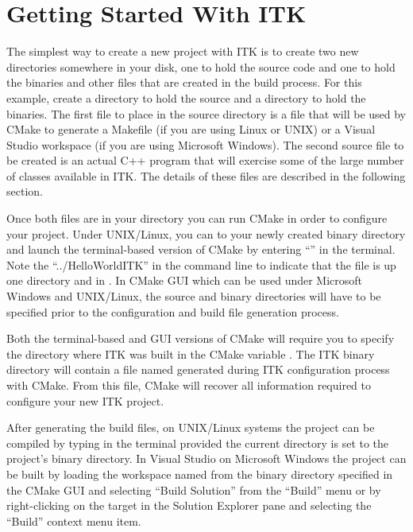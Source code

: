 \section{Getting Started With ITK}
\label{sec:GettingStartedWithITK}

The simplest way to create a new project with ITK is to create two new
directories somewhere in your disk, one to hold the source code and one to
hold the binaries and other files that are created in the build process. For
this example, create a  directory to hold the source and a
 directory to hold the binaries. The first file to
place in the source directory is a  file that will be
used by CMake to generate a Makefile (if you are using Linux or UNIX) or a
Visual Studio workspace (if you are using Microsoft Windows). The second source
file to be created is an actual C++ program that will exercise some of the large
number of classes available in ITK. The details of these files are described in
the following section.

Once both files are in your directory you can run CMake in order to configure
your project. Under UNIX/Linux, you can  to your newly created binary
directory and launch the terminal-based version of CMake by entering
``'' in the terminal. Note the
``../HelloWorldITK'' in the command line to indicate that the
 file is up one directory and in .
In CMake GUI which can be used under Microsoft Windows and UNIX/Linux, the
source and binary directories will have to be specified prior to the
configuration and build file generation process.

Both the terminal-based and GUI versions of CMake will require you to specify
the directory where ITK was built in the CMake variable . The ITK
binary directory will contain a file named  generated
during ITK configuration process with CMake. From this file, CMake will recover
all information required to configure your new ITK project.

After generating the build files, on UNIX/Linux systems the project can be
compiled by typing  in the terminal provided the current directory
is set to the project's binary directory. In Visual Studio on Microsoft Windows
the project can be built by loading the workspace named 
from the binary directory specified in the CMake GUI and selecting
``Build Solution'' from the ``Build'' menu or by right-clicking on
the  target in the Solution Explorer pane and selecting
the ``Build'' context menu item.

